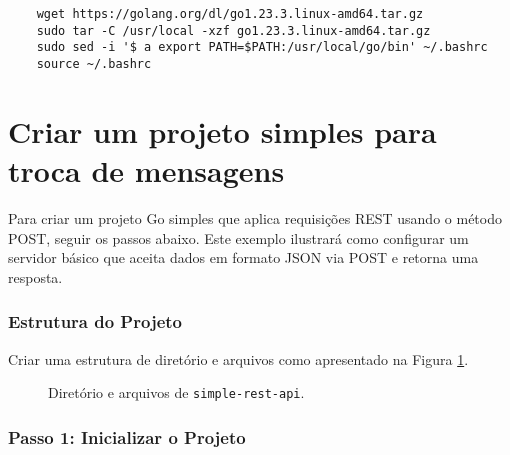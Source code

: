 \begin{verbatim}
    wget https://golang.org/dl/go1.23.3.linux-amd64.tar.gz
    sudo tar -C /usr/local -xzf go1.23.3.linux-amd64.tar.gz
    sudo sed -i '$ a export PATH=$PATH:/usr/local/go/bin' ~/.bashrc
    source ~/.bashrc
\end{verbatim}

\section{Criar um projeto simples para troca de mensagens}

Para criar um projeto Go simples que aplica requisições REST usando o método POST, seguir os passos abaixo. Este exemplo ilustrará como configurar um servidor básico que aceita dados em formato JSON via POST e retorna uma resposta.

\subsubsection{Estrutura do Projeto}
Criar uma estrutura de diretório e arquivos como apresentado na Figura \ref{fig:estrutura-simple-rest-api}.

\begin{figure}[h!]%
    \centering
\caption{Diretório e arquivos de \texttt{simple-rest-api}.}
\label{fig:estrutura-simple-rest-api}
\end{figure}%


\subsubsection{Passo 1: Inicializar o Projeto}

